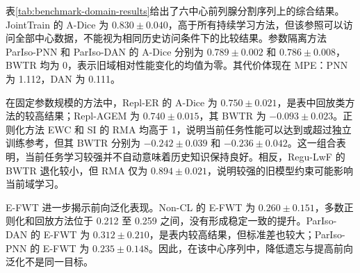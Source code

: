 表\ref{tab:benchmark-domain-results}给出了六中心前列腺分割序列上的综合结果。JointTrain 的 A-Dice 为 $0.830\pm0.040$，高于所有持续学习方法，但该参照可以访问全部中心数据，不能视为相同历史访问条件下的比较结果。参数隔离方法 ParIso-PNN 和 ParIso-DAN 的 A-Dice 分别为 $0.789\pm0.002$ 和 $0.786\pm0.008$，BWTR 均为 0，表示旧域相对性能变化的均值为零。其代价体现在 MPE：PNN 为 1.112，DAN 为 0.111。

在固定参数规模的方法中，Repl-ER 的 A-Dice 为 $0.750\pm0.021$，是表中回放类方法的较高结果；Repl-AGEM 为 $0.740\pm0.015$，其 BWTR 为 $-0.093\pm0.023$。正则化方法 EWC 和 SI 的 RMA 均高于 1，说明当前任务性能可以达到或超过独立训练参考，但其 BWTR 分别为 $-0.242\pm0.039$ 和 $-0.236\pm0.042$。这一组合表明，当前任务学习较强并不自动意味着历史知识保持良好。相反，Regu-LwF 的 BWTR 退化较小，但 RMA 仅为 $0.894\pm0.021$，说明较强的旧模型约束可能影响当前域学习。

E-FWT 进一步揭示前向泛化表现。Non-CL 的 E-FWT 为 $0.260\pm0.151$，多数正则化和回放方法位于 0.212 至 0.259 之间，没有形成稳定一致的提升。ParIso-DAN 的 E-FWT 为 $0.312\pm0.210$，是表内较高结果，但标准差也较大；ParIso-PNN 的 E-FWT 为 $0.235\pm0.148$。因此，在该中心序列中，降低遗忘与提高前向泛化不是同一目标。

